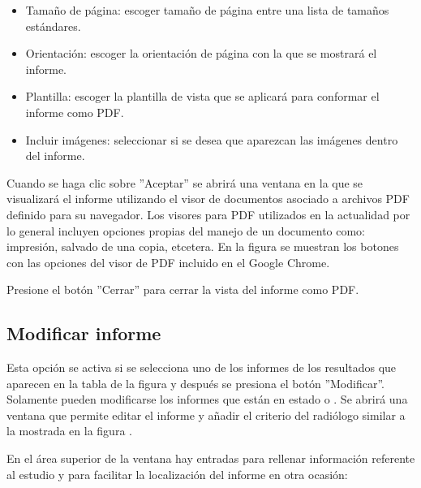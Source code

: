 \documentclass{plantilla-manual-usuario}
\begin{document}

\begin{itemize}
\item Tamaño de página: escoger tamaño de página entre una lista de tamaños estándares.
\item Orientación: escoger la orientación de página con la que se mostrará el informe.  
\item Plantilla: escoger la plantilla de vista que se aplicará para conformar el informe como PDF.
\item Incluir imágenes: seleccionar si se desea que aparezcan las imágenes dentro del informe.
\end{itemize}

Cuando se haga clic sobre ”Aceptar” se abrirá una ventana en la que se visualizará el informe utilizando el visor de documentos asociado a archivos PDF definido para su navegador. Los visores para PDF utilizados en la actualidad por lo general incluyen opciones propias del manejo de un documento como: impresión, salvado de una copia, etcetera. En la figura  se muestran los botones con las opciones del visor de PDF incluido en el Google Chrome. 


Presione el botón ”Cerrar” para cerrar la vista del informe como PDF.

\subsection{Modificar informe}\label{subsectionModificarInforme}

Esta opción se activa si se selecciona uno de los informes de los resultados que aparecen en la tabla de la figura  y después se presiona el botón ”Modificar”. Solamente pueden modificarse los informes que están en estado  o . Se abrirá una ventana que permite editar el informe y añadir el criterio del radiólogo similar a la mostrada en la figura .

En el área superior de la ventana hay entradas para rellenar información referente al estudio y para facilitar la localización del informe en otra ocasión:
\end{document}
